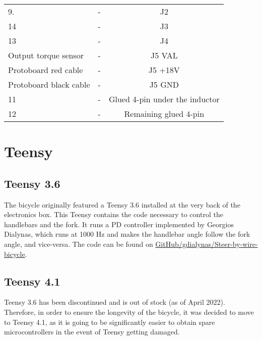 \begin{table}
{\begin{tabular}{lcc}
9.                                       & -                        & J2                              \\
14                                       & -                        & J3                              \\
13                                       & -                        & J4                              \\
Output torque sensor                     & -                        & J5 VAL                          \\
Protoboard red cable                     & -                        & J5 +18V                         \\
Protoboard black cable                   & -                        & J5 GND                          \\
11                                       & -                        & Glued 4-pin under the inductor  \\
12                                       & -                        & Remaining glued 4-pin           \\
\bottomrule
\end{tabular}
}
\label{tab:mc_power}
\end{table}

\section{Teensy}

\subsection{Teensy 3.6}
The bicycle originally featured a Teensy 3.6 installed at the very back of the electronics box. This Teensy contains the code necessary to control the handlebars and the fork. It runs a PD controller implemented by Georgios Dialynas, which runs at 1000 Hz and makes the handlebar angle follow the fork angle, and vice-versa. The code can be found on \href{https://github.com/gdialynas/Steer-by-wire-bicycle}{GitHub/gdialynas/Steer-by-wire-bicycle}.

\subsection{Teensy 4.1}
Teensy 3.6 has been discontinued and is out of stock (as of April 2022). Therefore, in order to ensure the longevity of the bicycle, it was decided to move to Teensy 4.1, as it is going to be significantly easier to obtain spare microcontrollers in the event of Teensy getting damaged.

